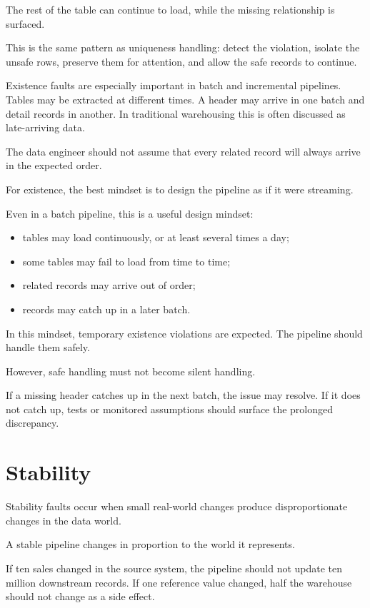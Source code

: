 \documentclass[10pt,openany,10pt]{book}
\providecommand{\tightlist}{%
  \setlength{\itemsep}{0pt}\setlength{\parskip}{0pt}}
\begin{document}
The rest of the table can continue to load, while the missing
relationship is surfaced.

This is the same pattern as uniqueness handling: detect the violation,
isolate the unsafe rows, preserve them for attention, and allow the safe
records to continue.

Existence faults are especially important in batch and incremental
pipelines. Tables may be extracted at different times. A header may
arrive in one batch and detail records in another. In traditional
warehousing this is often discussed as late-arriving data.

The data engineer should not assume that every related record will
always arrive in the expected order.

For existence, the best mindset is to design the pipeline as if it were
streaming.

Even in a batch pipeline, this is a useful design mindset:

\begin{itemize}
\tightlist
\item
  tables may load continuously, or at least several times a day;
\item
  some tables may fail to load from time to time;
\item
  related records may arrive out of order;
\item
  records may catch up in a later batch.
\end{itemize}

In this mindset, temporary existence violations are expected. The
pipeline should handle them safely.

However, safe handling must not become silent handling.

If a missing header catches up in the next batch, the issue may resolve.
If it does not catch up, tests or monitored assumptions should surface
the prolonged discrepancy.

\section{Stability}\label{stability}

Stability faults occur when small real-world changes produce
disproportionate changes in the data world.

A stable pipeline changes in proportion to the world it represents.

If ten sales changed in the source system, the pipeline should not
update ten million downstream records. If one reference value changed,
half the warehouse should not change as a side effect.
\end{document}
